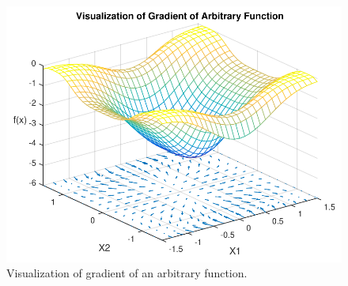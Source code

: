 \begin{figure}[H] 
	\centering
	\includegraphics[width=.8\textwidth]{figures/visualizationOfGradient}
	\caption{Visualization of gradient of an arbitrary function.}
	\label{visualizationOfGradient}
\end{figure}

